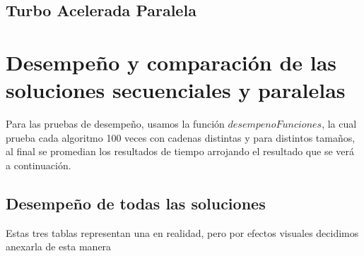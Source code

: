 \documentclass[conference]{IEEEtran}
\begin{document}
\subsection{\textbf{Turbo Acelerada Paralela}}



\section{\textbf{Desempeño  y comparación de las soluciones secuenciales y paralelas} }

Para las pruebas de desempeño, usamos la función $desempenoFunciones$, la cual prueba cada algoritmo 100 veces con cadenas distintas y para distintos tamaños, al final se promedian los resultados de tiempo
arrojando el resultado que se verá a continuación.

\subsection{\textbf{Desempeño de todas las soluciones}}

Estas tres tablas representan una en realidad, pero por efectos visuales decidimos anexarla de esta manera

\newpage

\end{document}
